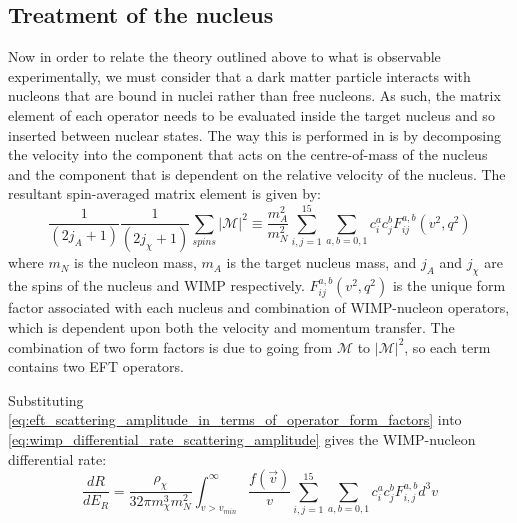 \subsection{Treatment of the nucleus}
\par
Now in order to relate the theory outlined above to what is observable experimentally, we must consider that a dark matter particle interacts with nucleons that are bound in nuclei rather than free nucleons.
As such, the matrix element of each operator needs to be evaluated inside the target nucleus and so inserted between nuclear states.
The way this is performed in \cite{Fitzpatrick_2013_ref} is by decomposing the velocity into the component that acts on the centre-of-mass of the nucleus and the component that is dependent on the relative velocity of the nucleus.
The resultant spin-averaged matrix element is given by:
\begin{equation}
    \frac{1}{(2j_A + 1)}\frac{1}{(2j_\chi + 1)} \sum_{spins} |\mathcal{M}|^2 \equiv
    \frac{m_A^2}{m_N^2} \sum_{i,j=1}^{15} \sum_{a,b=0,1} c_i^{a}c_{j}^{b} F_{ij}^{a,b} (v^2,q^2)
    \label{eq:eft_scattering_amplitude_in_terms_of_operator_form_factors}
\end{equation}
where $m_N$ is the nucleon mass, $m_A$ is the target nucleus mass, and $j_A$ and $j_\chi$ are the spins of the nucleus and WIMP respectively. 
$F^{a,b}_{ij} (v^2,q^2)$ is the unique form factor associated with each nucleus and combination of WIMP-nucleon operators, which is dependent upon both the velocity and momentum transfer.
The combination of two form factors is due to going from $\mathcal{M}$ to $|\mathcal{M}|^2$, so each term contains two EFT operators.

\par
Substituting \autoref{eq:eft_scattering_amplitude_in_terms_of_operator_form_factors} into \autoref{eq:wimp_differential_rate_scattering_amplitude} gives the WIMP-nucleon differential rate:
\begin{equation}
    \frac{dR}{dE_R} = \frac{\rho_{\chi}}{32 \pi m_\chi^3 m_N^2} \int^{\infty}_{v>v_{min}} \frac{f(\vec{v})}{v} \sum_{i,j=1}^{15} \sum_{a,b=0,1} c_i^a c_j^b F_{i,j}^{a,b} d^3 v
    \label{eq:final_eft_differential_cross_section}
\end{equation}


